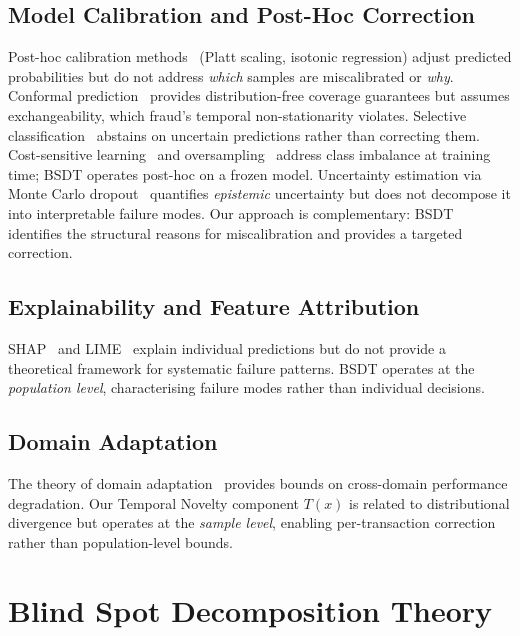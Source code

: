 \documentclass[journal]{IEEEtran}
\begin{document}
\subsection{Model Calibration and Post-Hoc Correction}

Post-hoc calibration methods~\cite{platt1999} (Platt scaling, isotonic regression) adjust predicted probabilities but do not address \textit{which} samples are miscalibrated or \textit{why}. Conformal prediction~\cite{vovk2005} provides distribution-free coverage guarantees but assumes exchangeability, which fraud's temporal non-stationarity violates. Selective classification~\cite{geifman2017} abstains on uncertain predictions rather than correcting them. Cost-sensitive learning~\cite{elkan2001} and oversampling~\cite{chawla2002} address class imbalance at training time; BSDT operates post-hoc on a frozen model. Uncertainty estimation via Monte Carlo dropout~\cite{gal2016} quantifies \emph{epistemic} uncertainty but does not decompose it into interpretable failure modes. Our approach is complementary: BSDT identifies the structural reasons for miscalibration and provides a targeted correction.

\subsection{Explainability and Feature Attribution}

SHAP~\cite{lundberg2017} and LIME~\cite{ribeiro2016} explain individual predictions but do not provide a theoretical framework for systematic failure patterns. BSDT operates at the \textit{population level}, characterising failure modes rather than individual decisions.

\subsection{Domain Adaptation}

The theory of domain adaptation~\cite{bendavid2010} provides bounds on cross-domain performance degradation. Our Temporal Novelty component $T(x)$ is related to distributional divergence but operates at the \textit{sample level}, enabling per-transaction correction rather than population-level bounds.

\section{Blind Spot Decomposition Theory}
\label{sec:bsdt}
\end{document}

